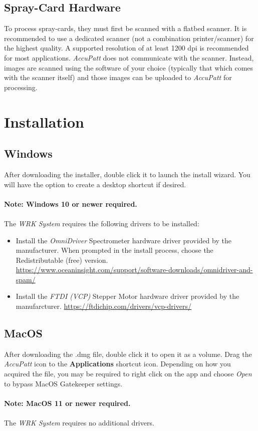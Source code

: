 \documentclass[10pt,letterpaper,titlepage]{article}
\begin{document}
    \subsection{Spray-Card Hardware}
    To process spray-cards, they must first be scanned with a flatbed scanner. It is recommended to use a dedicated scanner (not a combination printer/scanner) for the highest quality. A supported resolution of at least 1200 dpi is recommended for most applications. \textit{AccuPatt} does not communicate with the scanner. Instead, images are scanned using the software of your choice (typically that which comes with the scanner itself) and those images can be uploaded to \textit{AccuPatt} for processing.
    
    \newpage

    \section{Installation}

    \subsection{Windows}
    After downloading the installer, double click it to launch the install wizard. You will have the option to create a desktop shortcut if desired.\\
    \\\textbf{\color{red}Note: Windows 10 or newer required.\color{black}}\\\\
    The \textit{WRK System} requires the following drivers to be installed:
    \begin{itemize}
        \item Install the \textit{OmniDriver} Spectrometer hardware driver provided by the manufacturer. When prompted in the install process, choose the Redistributable (free) version. \url{https://www.oceaninsight.com/support/software-downloads/omnidriver-and-spam/}
        \item Install the \textit{FTDI (VCP)} Stepper Motor hardware driver provided by the manufarcturer. \url{https://ftdichip.com/drivers/vcp-drivers/}
    \end{itemize}
    \subsection{MacOS}
    After downloading the .dmg file, double click it to open it as a volume. Drag the \textit{AccuPatt} icon to the \textbf{Applications} shortcut icon. Depending on how you acquired the file, you may be required to right click on the app and choose \textit{Open} to bypass MacOS Gatekeeper settings.\\ 
    \\\textbf{\color{red}Note: MacOS 11 or newer required.\color{black}}\\\\
    The \textit{WRK System} requires no additional drivers.
    \newpage
\end{document}
